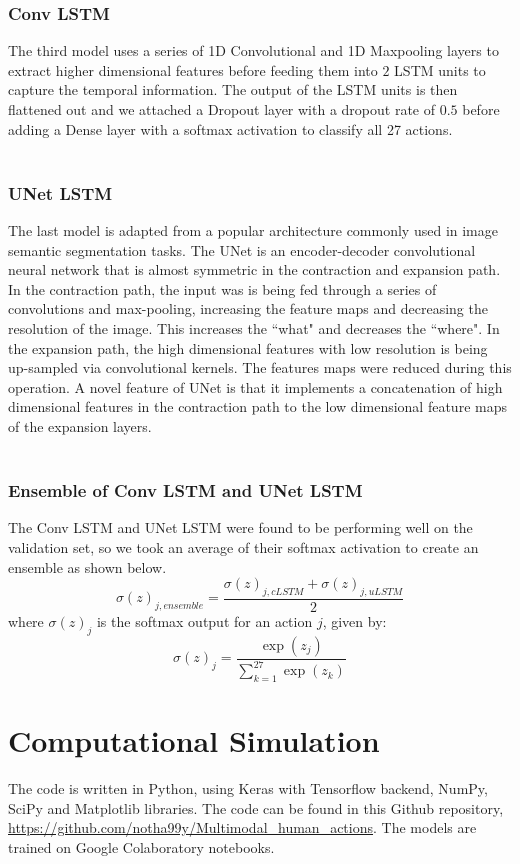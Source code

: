 \documentclass[conference]{IEEEtran}
\begin{document}
\subsubsection{Conv LSTM}
The third model uses a series of 1D Convolutional and 1D Maxpooling layers to extract higher dimensional features before feeding them into $2$ LSTM units to capture the temporal information. The output of the LSTM units is then flattened out and we attached a Dropout layer with a dropout rate of $0.5$ before adding a Dense layer with a softmax activation to classify all 27 actions.\\ \\
\subsubsection{UNet LSTM}
The last model is adapted from a popular architecture commonly used in image semantic segmentation tasks. The UNet \cite{UNet} is an encoder-decoder convolutional neural network that is almost symmetric in the contraction and expansion path. In the contraction path, the input was is being fed through a series of convolutions and max-pooling, increasing the feature maps and decreasing the resolution of the image. This increases the ``what" and decreases the ``where". In the expansion path, the high dimensional features with low resolution is being up-sampled via convolutional kernels. The features maps were reduced during this operation. A novel feature of UNet is that it implements a concatenation of high dimensional features in the contraction path to the low dimensional feature maps of the expansion layers.\\ \\
\subsubsection{Ensemble of Conv LSTM and UNet LSTM}
The Conv LSTM and UNet LSTM were found to be performing well on the validation set, so we took an average of their softmax activation to create an ensemble as shown below.
\begin{equation}
\sigma(z)_{j, ensemble} = \frac{\sigma(z)_{j, cLSTM} + \sigma(z)_{j, uLSTM}}{2}
\end{equation}
where $\sigma(z)_j$ is the softmax output for an action $j$, given by:
\begin{equation}
\sigma(z)_j = \frac{\exp(z_j)}{\sum^{27}_{k=1} \exp (z_k)}
\end{equation}
\section{Computational Simulation}
The code is written in Python, using Keras with Tensorflow backend, NumPy, SciPy and Matplotlib libraries. The code can be found in this Github repository, \url{https://github.com/notha99y/Multimodal\_human\_actions}. The models are trained on Google Colaboratory notebooks.
\end{document}
